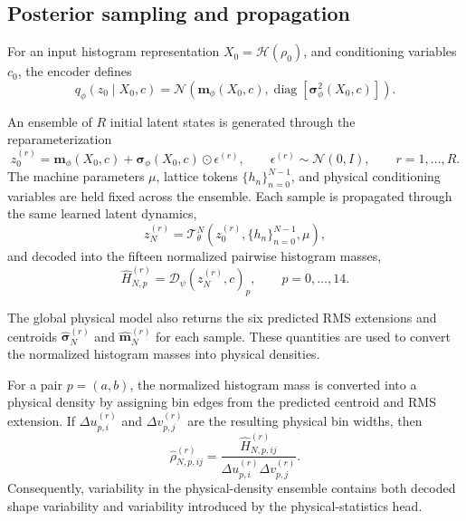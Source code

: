 \subsection{Posterior sampling and propagation}
\label{subsubsec:posterior_sampling_propagation}

For an input histogram representation $X_0 = \mathcal{H}(\rho_0) $, and conditioning variables $c_0$, the encoder defines
\begin{equation}
q_{\phi}(z_0\mid X_0,c)
=
\mathcal{N}
\left(
\boldsymbol{m}_{\phi}(X_0,c),
\operatorname{diag}
\left[
\boldsymbol{\sigma}_{\phi}^{2}(X_0,c)
\right]
\right).
\label{eq:uq_conditional_posterior}
\end{equation}

An ensemble of $R$ initial latent states is generated through the reparameterization
\begin{equation}
z_0^{(r)}
=
\boldsymbol{m}_{\phi}(X_0,c)
+
\boldsymbol{\sigma}_{\phi}(X_0,c)
\odot
\epsilon^{(r)},
\qquad
\epsilon^{(r)}
\sim
\mathcal{N}(0,I),
\qquad
r=1,\ldots,R.
\label{eq:uq_latent_reparameterization}
\end{equation}
The machine parameters $\mu$, lattice tokens $\{h_n\}_{n=0}^{N-1}$, and physical conditioning variables are held fixed across the ensemble. Each sample is propagated through the same learned latent dynamics,
\begin{equation}
z_N^{(r)}
=
\mathcal{T}_{\theta}^{N}
\left(
z_0^{(r)},
\{h_n\}_{n=0}^{N-1},
\mu
\right),
\label{eq:uq_latent_rollout}
\end{equation}
and decoded into the fifteen normalized pairwise histogram masses,
\begin{equation}
\widehat{H}_{N,p}^{(r)}
=
\mathcal{D}_{\psi}
\left(
z_N^{(r)},c
\right)_p,
\qquad
p=0,\ldots,14.
\label{eq:uq_histogram_decode}
\end{equation}

The global physical model also returns the six predicted RMS extensions and centroids $\widehat{\boldsymbol{\sigma}}_N^{(r)}$ and $\widehat{\boldsymbol{m}}_N^{(r)}$ for each sample. These quantities are used to convert the normalized histogram masses into physical densities.

For a pair \(p=(a,b)\), the normalized histogram mass is converted into a physical density by assigning bin edges from the predicted centroid and RMS extension. If \(\Delta u_{p,i}^{(r)}\) and \(\Delta v_{p,j}^{(r)}\) are the resulting physical bin widths, then
\begin{equation}
\widehat{\rho}_{N,p,ij}^{(r)}
=
\frac{
\widehat{H}_{N,p,ij}^{(r)}
}{
\Delta u_{p,i}^{(r)}
\Delta v_{p,j}^{(r)}
}.
\label{eq:uq_mass_to_density}
\end{equation}
Consequently, variability in the physical-density ensemble contains both decoded shape variability and variability introduced by the physical-statistics head.


